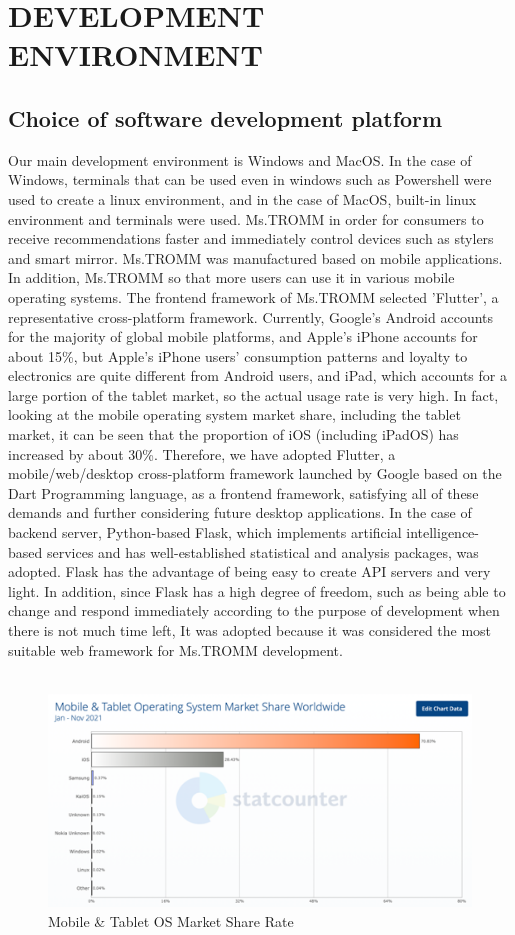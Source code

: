 \documentclass[conference]{IEEEtran}
\begin{document}
\section{DEVELOPMENT ENVIRONMENT }
\subsection{Choice of software development platform}
Our main development environment is Windows and MacOS. In the case of Windows, terminals that can be used even in windows such as Powershell were used to create a linux environment, and in the case of MacOS, built-in linux environment and terminals were used. Ms.TROMM in order for consumers to receive recommendations faster and immediately control devices such as stylers and smart mirror. Ms.TROMM was manufactured based on mobile applications. In addition, Ms.TROMM so that more users can use it in various mobile operating systems. The frontend framework of Ms.TROMM selected 'Flutter', a representative cross-platform framework. Currently, Google's Android accounts for the majority of global mobile platforms, and Apple's iPhone accounts for about 15\%, but Apple's iPhone users' consumption patterns and loyalty to electronics are quite different from Android users, and iPad, which accounts for a large portion of the tablet market, so the actual usage rate is very high. In fact, looking at the mobile operating system market share, including the tablet market, it can be seen that the proportion of iOS (including iPadOS) has increased by about 30\%. Therefore, we have adopted Flutter, a mobile/web/desktop cross-platform framework launched by Google based on the Dart Programming language, as a frontend framework, satisfying all of these demands and further considering future desktop applications. In the case of backend server, Python-based Flask, which implements artificial intelligence-based services and has well-established statistical and analysis packages, was adopted. Flask has the advantage of being easy to create API servers and very light. In addition, since Flask has a high degree of freedom, such as being able to change and respond immediately according to the purpose of development when there is not much time left, It was adopted because it was considered the most suitable web framework for Ms.TROMM development.\\ \\

\begin{figure}[]
\centerline{\includegraphics{그림1.png}}
\caption{Mobile \& Tablet OS Market Share Rate}
\label{fig}
\end{figure}
\end{document}
